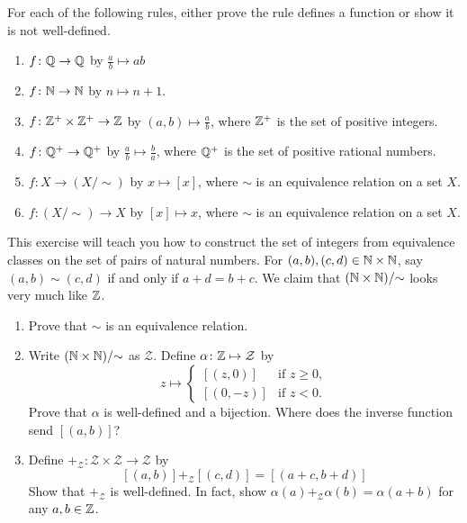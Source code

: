 \documentclass[../main.tex]{subfiles}
\begin{document}
\begin{homework}
    For each of the following rules, either prove the rule defines a function or show it is not well-defined.
    \begin{enumerate}[label=(\alph*)]
        \item $f\colon \mathbb Q \to \mathbb Q$ by $\frac{a}{b} \mapsto ab$
        \item $f\colon \mathbb N \to \mathbb N$ by $n \mapsto n + 1$.
        \item $f\colon \mathbb Z^+ \times \mathbb Z^+ \to \mathbb Z$ by $(a, b) \mapsto \frac{a}{b}$, where $\mathbb Z^+$ is the set of positive integers.
        \item $f\colon \mathbb Q^+ \to \mathbb Q^+$ by $\frac ab\mapsto\frac ba$, where $\mathbb Q^+$ is the set of positive rational numbers.
        \item $f\colon X \to (X / {\sim})$ by $x \mapsto [x]$, where $\sim$ is an equivalence relation on a set $X$.
        \item $f\colon (X / {\sim}) \to X$ by $[x] \mapsto x$, where $\sim$ is an equivalence relation on a set $X$.
    \end{enumerate}
\end{homework}
\begin{homework}
    This exercise will teach you how to construct the set of integers from equivalence classes on the set of pairs of natural numbers. For $(a, b), (c, d) \in \mathbb N \times \mathbb N$, say $(a, b) \sim (c, d)$ if and only if $a + d = b + c$. We claim that $(\mathbb N \times \mathbb N) /{\sim}$ looks very much like $\mathbb Z$.
    \begin{enumerate}[label=(\alph*)]
        \item Prove that $\sim$ is an equivalence relation.
        \item Write $(\mathbb N \times \mathbb N) /{\sim}$ as $\mathcal{Z}$. Define $\alpha\colon \mathbb Z \mapsto \mathcal{Z}$ by
        \[z \mapsto \begin{cases} [(z, 0)] & \text{if }z \geq 0, \\ [(0, -z)] & \text{if }z < 0. \end{cases}\]
        Prove that $\alpha$ is well-defined and a bijection. Where does the inverse function send $[(a,b)]$?
        \item Define $+_{\mathcal{Z}}\colon \mathcal{Z} \times \mathcal{Z} \to \mathcal{Z}$ by
        $$[(a, b)] +_{\mathcal{Z}} [(c, d)] = [(a + c, b + d)]$$
        Show that $+_{\mathcal{Z}}$ is well-defined. In fact, show $\alpha(a) +_{\mathcal{Z}} \alpha(b) = \alpha(a + b)$ for any $a,b\in\mathbb Z$.
    \end{enumerate}
\end{homework}
\end{document}
